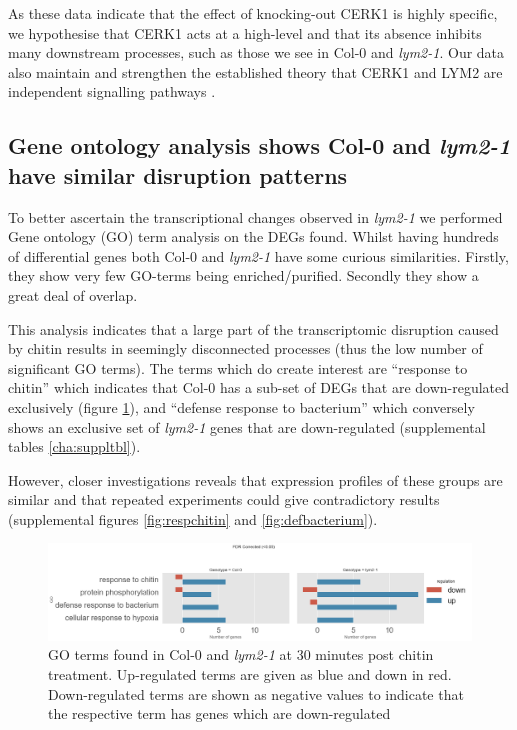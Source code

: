 \documentclass[../main.tex]{subfiles}
\begin{document}
As these data indicate that the effect of knocking-out CERK1 is highly specific,
we hypothesise that CERK1 acts at a high-level and that its absence
inhibits many downstream processes, such as those we see in Col-0 and \textit{lym2-1}.
Our data also maintain and strengthen the established theory that CERK1 and LYM2 are
independent signalling pathways \cite{Faulkner2013, miyaCERK1LysMReceptor2007,
  narusakaPresenceLYM2Dependent2013}.



\subsection{Gene ontology analysis shows Col-0 and \textit{lym2-1} have similar
  disruption patterns}

To better ascertain the transcriptional changes observed in \textit{lym2-1} we
performed Gene ontology (GO) term analysis on the DEGs found. Whilst having
hundreds of differential genes both Col-0 and \textit{lym2-1} have some curious
similarities. Firstly, they show very few GO-terms being enriched/purified.
Secondly they show a great deal of overlap.

This analysis indicates that a large part of the transcriptomic disruption
caused by chitin results in seemingly disconnected processes (thus the low
number of significant GO terms). The terms which do create interest are
``response to chitin'' which indicates that Col-0 has a sub-set of DEGs that are
down-regulated exclusively (figure \ref{fig:05hrGO}), and ``defense response to bacterium''
which conversely shows an exclusive set of \textit{lym2-1} genes that are
down-regulated (supplemental
tables \ref{cha:suppltbl}).

However, closer investigations reveals that expression profiles of these groups
are similar and that repeated experiments could give contradictory results
(supplemental figures \ref{fig:respchitin} and \ref{fig:defbacterium}).


\begin{figure}[ht]
  \centering
  \includegraphics[width=\columnwidth]{figures/05hrGO.png}
  \caption[GO terms found in Col-0 and \textit{lym2-1} at 30
    minutes post chitin treatment]{\label{fig:05hrGO} GO terms found in Col-0 and \textit{lym2-1} at 30
    minutes post chitin treatment. Up-regulated terms are given as blue and down
  in red. Down-regulated terms are shown as negative values to indicate that the
  respective term has genes which are down-regulated}
\end{figure}
\end{document}
